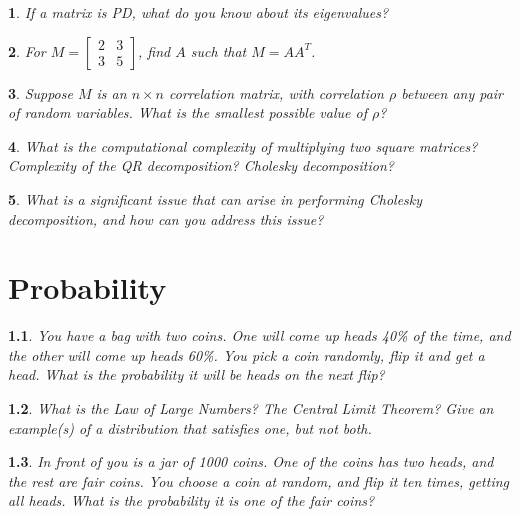 \documentclass{report}
\newtheorem{problem}{}
\numberwithin{problem}{chapter} %
\begin{document}
\begin{problem}
If a matrix is PD, what do you know about its eigenvalues?
\end{problem}

\begin{problem}
For $M =\begin{bmatrix}
    2  & 3 \\
    3  & 5
\end{bmatrix}$, find $A$ such that $M=AA^{T}$.
\end{problem}

\begin{problem}
Suppose $M$ is an $n\times n$ correlation matrix, with correlation $\rho$ between any pair of random variables. What is the smallest possible value of $\rho$?
\end{problem}

\begin{problem}
What is the computational complexity of multiplying two square matrices? Complexity of the QR decomposition? Cholesky decomposition?
\end{problem}

\begin{problem}
What is a significant issue that can arise in performing Cholesky decomposition, and how can you address this issue?
\end{problem}

\chapter{Probability}

\begin{problem}
You have a bag with two coins. One will come up heads 40\% of the time, and the other will come up heads 60\%. You pick a coin randomly, flip it and get a head. What is the probability it will be heads on the next flip?
\end{problem}

\begin{problem}
What is the Law of Large Numbers? The Central Limit Theorem? Give an example(s) of a distribution that satisfies one, but not both.
\end{problem}

\begin{problem}
In front of you is a jar of 1000 coins. One of the coins has two heads, and the rest are fair coins. You choose a coin at random, and flip it ten times, getting all heads. What is the probability it is one of the fair coins?
\end{problem}
\end{document}
